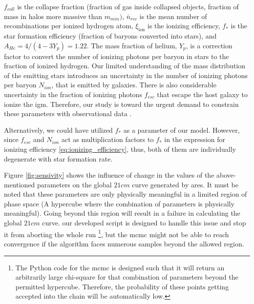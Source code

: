 \documentclass[12pt, TexShade, letterpaper]{report}
\begin{document}
\begin{enumerate}
    $f_{coll}$ is the collapse fraction (fraction of gas inside collapsed objects, fraction of mass in halos more massive than $m_{min})$, $\bar{n}_{rec}$ is the mean number of recombinations per ionized hydrogen atom, $\xi_{\text{ion}}$ is the ionizing efficiency, $f_*$ is the star formation efficiency (fraction of baryons converted into stars), and $A_{He} = 4/(4 - 3Y_p) = 1.22$. The mass fraction of helium, $Y_p$, is a correction factor to convert the number of ionizing photons per baryon in stars to the fraction of ionized hydrogen. Our limited understanding of the mass distribution of the emitting stars introduces an uncertainty in the number of ionizing photons per baryon $N_{ion}$, that is emitted by galaxies. There is also considerable uncertainty in the fraction of ionizing photons $f_{esc}$ that escape the host galaxy to ionize the \gls{igm}. Therefore, our study is toward the urgent demand to constrain these parameters with observational data \cite{low_frequency, 21century}.\par
    Alternatively, we could have utilized $f_*$ as a parameter of our model. However, since $f_{esc}$ and $N_{ion}$ act as multiplication factors to $f_*$ in the expression for ionizing efficiency \ref{eq:ionizing_efficiency}, thus, both of them are individually degenerate with star formation rate.
\end{enumerate}
Figure \ref{fig:sensivity} shows the influence of change in the values of the above-mentioned parameters on the global $21cm$ curve generated by \gls{ares}. It must be noted that these parameters are only physically meaningful in a limited region of phase space (A hypercube where the combination of parameters is physically meaningful). Going beyond this region will result in a failure in calculating the global $21cm$ curve. our developed script is designed to handle this issue and stop it from aborting the whole run \footnote{The Python code for the \gls{mcmc} is designed such that it will return an arbitrarily large chi-square for that combination of parameters beyond the permitted hypercube. Therefore, the probability of these points getting accepted into the chain will be automatically low.}, but the \gls{mcmc} might not be able to reach convergence if the algorithm faces numerous samples beyond the allowed region.\par
\end{document}
